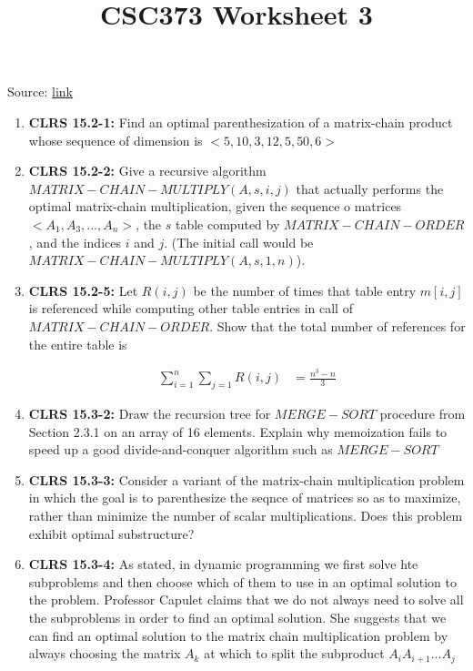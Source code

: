 \documentclass[12pt]{article}
\begin{document}
\title{CSC373 Worksheet 3}
\maketitle

\bigskip

Source: \href{http://www.cs.toronto.edu/~denisp/csc373/material.html}{link}

\begin{enumerate}[1.]
    \item \textbf{CLRS 15.2-1:} Find an optimal parenthesization of a matrix-chain product whose sequence of dimension is
    $<5,10,3,12,5,50,6>$

    \item \textbf{CLRS 15.2-2:} Give a recursive algorithm $MATRIX-CHAIN-MULTIPLY(A,s,i,j)$ that actually
    performs the optimal matrix-chain multiplication, given the sequence o matrices $<A_1, A_3, ..., A_n>$,
    the $s$ table computed by $MATRIX-CHAIN-ORDER$, and the indices $i$ and $j$. (The
    initial call would be $MATRIX-CHAIN-MULTIPLY(A,s,1,n)$).

    \item \textbf{CLRS 15.2-5:} Let $R(i,j)$ be the number of times that table entry $m[i,j]$ is referenced
    while computing other table entries in call of $MATRIX-CHAIN-ORDER$. Show that the
    total number of references for the entire table is

    \begin{align*}
    \sum\limits_{i=1}^n \sum\limits_{j=1} R(i,j) &= \frac{n^3 - n}{3}
    \end{align*}

    \item \textbf{CLRS 15.3-2:} Draw the recursion tree for $MERGE-SORT$ procedure from Section 2.3.1 on an
    array of 16 elements. Explain why memoization fails to speed up a good divide-and-conquer algorithm such as $MERGE-SORT$

    \item \textbf{CLRS 15.3-3:} Consider a variant of the matrix-chain multiplication problem in which the goal
    is to parenthesize the seqnce of matrices so as to maximize, rather than minimize the number of scalar multiplications.
    Does this problem exhibit optimal substructure?

    \item \textbf{CLRS 15.3-4:} As stated, in dynamic programming we first solve hte subproblems and then choose which of them
    to use in an optimal solution to the problem. Professor Capulet claims that we do not always need to solve all the subproblems
    in order to find an optimal solution. She suggests that we can find an optimal solution to the matrix chain multiplication problem
    by always choosing the matrix $A_k$ at which to split the subproduct $A_iA_{i+1}...A_j$


\end{enumerate}
\end{document}
